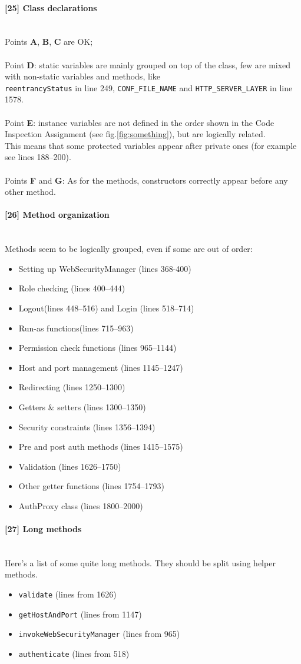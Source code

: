 \documentclass[a4paper, 11pt]{article}
\newcommand{\code}[1]{\texttt{#1}}
\newcommand{\issue}[3][?]{
    \paragraph{[#1] #2} \mbox{}\\ #3
}
\begin{document}
\issue[25]{Class declarations} {
    Points \textbf{A}, \textbf{B}, \textbf{C} are OK; \\ \\
    Point \textbf{D}: static variables are mainly grouped on top of 
    the class, few are mixed with non-static variables and methods, like \\
    \code{reentrancyStatus} in line 249, \code{CONF\_FILE\_NAME} and
    \code{HTTP\_SERVER\_LAYER} in line 1578. \\ \\ 
    Point \textbf{E}: instance variables are not 
    defined in the order shown in the Code Inspection Assignment 
    (see fig.\ref{fig:something}), but are logically related. \\
    This means that some protected variables appear after private ones 
    (for example see lines 188--200). \\ \\ 
    Points \textbf{F} and \textbf{G}: As for the methods, constructors correctly appear before any 
    other method.
}

\issue[26]{Method organization} {
Methods seem to be logically grouped, even if some are out of order: 
\begin{itemize}
    \item Setting up WebSecurityManager (lines 368-400)
    \item Role checking (lines 400--444)
    \item Logout(lines 448--516) and Login (lines 518--714)
    \item Run-as functions(lines 715--963)
    \item Permission check functions (lines 965--1144)
    \item Host and port management (lines 1145--1247)
    \item Redirecting (lines 1250--1300)
    \item Getters \& setters (lines 1300--1350)
    \item Security constraints (lines 1356--1394)
    \item Pre and post auth methods (lines 1415--1575)
    \item Validation (lines 1626--1750)
    \item Other getter functions (lines 1754--1793)
    \item AuthProxy class (lines 1800--2000) 
\end{itemize}
}

\issue[27]{Long methods} {
    Here's a list of some quite long methods. 
    They should be split using helper methods.
    \begin{itemize} 
        \item \code{validate} (lines from 1626)
        \item \code{getHostAndPort} (lines from 1147)
        \item \code{invokeWebSecurityManager} (lines from 965)
        \item \code{authenticate} (lines from 518) 
    \end{itemize}
}
\end{document}
